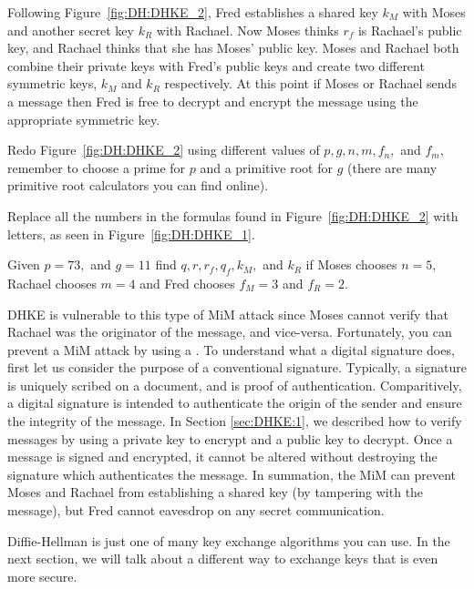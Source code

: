 Following Figure~\ref{fig:DH:DHKE_2}, Fred establishes a shared key $k_M$ with Moses and another secret key $k_R$ with Rachael.  Now Moses thinks $r_f$ is Rachael's public key, and Rachael thinks that she has Moses' public key. Moses and Rachael both combine their private keys with Fred's public keys and create two different symmetric keys, $k_M$ and $k_R$ respectively. At this point if Moses or Rachael sends a message then Fred is free to decrypt and encrypt the message using the appropriate symmetric key. 

\begin{exercise}{}
Redo Figure~\ref{fig:DH:DHKE_2} using different values of $p, g, n,m, f_n,$ and $f_m$, remember to choose a prime for $p$ and a primitive root for $g$ (there are many primitive root calculators you can find online).
\end{exercise}

\begin{exercise}{}
Replace all the numbers in the formulas found in Figure~\ref{fig:DH:DHKE_2} with letters, as seen in Figure~\ref{fig:DH:DHKE_1}.
\end{exercise}

\begin{exercise}{}
Given $p=73,$ and $g=11$ find $q, r, r_f, q_f, k_M,$ and $k_R$ if Moses chooses $n=5$, Rachael chooses $m=4$ and Fred chooses $f_M=3$ and $f_R=2$.
\end{exercise}

DHKE is vulnerable to this type of MiM attack since Moses cannot verify that Rachael was the originator of the message, and vice-versa.  Fortunately, you can prevent a MiM attack by using a .  To understand what a digital signature does, first let us consider the purpose of a conventional signature.  Typically, a signature is uniquely scribed on a document, and is proof of authentication.  Comparitively, a digital signature is intended to authenticate the origin of the sender and ensure the integrity of the message.  In Section \ref{sec:DHKE:1}, we described how to verify messages by using a private key to encrypt and a public key to decrypt.  Once a message is signed and encrypted, it cannot be altered without destroying the signature which authenticates the message. In summation, the MiM can prevent Moses and Rachael from establishing a shared key (by tampering with the message), but Fred cannot eavesdrop on any secret communication.

 Diffie-Hellman is just one of many key exchange algorithms you can use. In the next section, we will talk about a different way to exchange keys that is even more secure.

